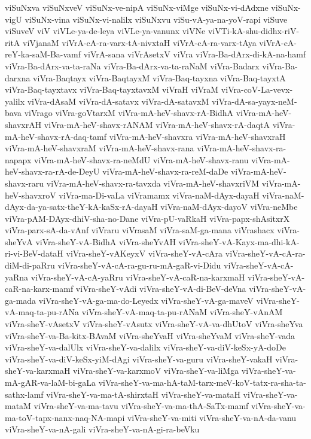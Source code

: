 {viSuNxva
viSuNxveV
viSuNx-ve-nipA
viSuNx-viMge
viSuNx-vi-dAdxne
viSuNx-vigU
viSuNx-vina
viSuNx-vi-nalilx
viSuNxvu
viSu-vA-ya-na-yoV-rapi
viSuve
viSuveV
viV
viVLe-ya-de-leya
viVLe-ya-vanunx
viVNe
viVTi-kA-shu-didhx-riV-ritA
viVjanaM
viVrA-cA-ra-varx-tA-nivxtaH
viVrA-cA-ra-varx-tAya
viVrA-cA-reY-ka-saM-Ba-vamf
viVrA-sana
viVrAsetxV
viVra
viVra-Ba-dArx-di-kA-na-hamf
viVra-Ba-dArx-va-ta-raNa
viVra-Ba-dArx-va-ta-raNaM
viVra-Badarx
viVra-Ba-darxna
viVra-Baqtayx
viVra-BaqtayxM
viVra-Baq-tayxna
viVra-Baq-tayxtA
viVra-Baq-tayxtavx
viVra-Baq-tayxtavxM
viVraH
viVraM
viVra-coV-La-vevx-yalilx
viVra-dAsaM
viVra-dA-satavx
viVra-dA-satavxM
viVra-dA-sa-yayx-neM-bava
viVrago
viVra-goVtarxM
viVra-mA-heV-shavx-rA-BidhA
viVra-mA-heV-shavxrAH
viVra-mA-heV-shavx-rANAM
viVra-mA-heV-shavx-rA-daqtA
viVra-mA-heV-shavx-rA-daq-tamf
viVra-mA-heV-shavxra
viVra-mA-heV-shavxraH
viVra-mA-heV-shavxraM
viVra-mA-heV-shavx-rana
viVra-mA-heV-shavx-ra-napapx
viVra-mA-heV-shavx-ra-neMdU
viVra-mA-heV-shavx-ranu
viVra-mA-heV-shavx-ra-rA-de-DeyU
viVra-mA-heV-shavx-ra-reM-daDe
viVra-mA-heV-shavx-raru
viVra-mA-heV-shavx-ra-tavxda
viVra-mA-heV-shavxriVM
viVra-mA-heV-shavxroV
viVra-ma-Di-vaLa
viVramamx
viVra-naM-dAyx-dayaH
viVra-naM-dAyx-da-ya-satx-theY-kA-kaSx-rA-dayaH
viVra-naM-dAyx-dayoV
viVra-neMbe
viVra-pAM-DAyx-dhiV-sha-no-Dane
viVra-pU-vaRkaH
viVra-papx-shAsitxrX
viVra-parx-sA-da-vAnf
viVraru
viVrasaM
viVra-saM-ga-mana
viVrashacx
viVra-sheYvA
viVra-sheY-vA-BidhA
viVra-sheYvAH
viVra-sheY-vA-Kayx-ma-dhi-kA-ri-vi-BeV-dataH
viVra-sheY-vAKeyxV
viVra-sheY-vA-cAra
viVra-sheY-vA-cA-ra-diM-di-paRru
viVra-sheY-vA-cA-ra-gu-ru-mA-gaR-vi-Didu
viVra-sheY-vA-cA-yaRna
viVra-sheY-vA-cA-yaRru
viVra-sheY-vA-caR-na-karxmaH
viVra-sheY-vA-caR-na-karx-mamf
viVra-sheY-vAdi
viVra-sheY-vA-di-BeV-deVna
viVra-sheY-vA-ga-mada
viVra-sheY-vA-ga-ma-do-Leyedx
viVra-sheY-vA-ga-maveV
viVra-sheY-vA-maq-ta-pu-rANa
viVra-sheY-vA-maq-ta-pu-rANaM
viVra-sheY-vAnAM
viVra-sheY-vAsetxV
viVra-sheY-vAsutx
viVra-sheY-vA-va-dhUtoV
viVra-sheYva
viVra-sheY-va-Ba-kitx-BAvaM
viVra-sheYvaH
viVra-sheYvaM
viVra-sheY-vada
viVra-sheY-va-dalUlx
viVra-sheY-va-dalilx
viVra-sheY-va-diV-keSx-yA-doDe
viVra-sheY-va-diV-keSx-yiM-dAgi
viVra-sheY-va-guru
viVra-sheY-vakaH
viVra-sheY-va-karxmaH
viVra-sheY-va-karxmoV
viVra-sheY-va-liMga
viVra-sheY-va-mA-gAR-va-laM-bi-gaLa
viVra-sheY-va-ma-hA-taM-tarx-meV-koV-tatx-ra-sha-ta-sathx-lamf
viVra-sheY-va-ma-tA-shirxtaH
viVra-sheY-va-mataH
viVra-sheY-va-mataM
viVra-sheY-va-ma-tavu
viVra-sheY-va-ma-thA-SaTx-mamf
viVra-sheY-va-ma-toV-tapx-nanx-naq-NA-mapi
viVra-sheY-va-miti
viVra-sheY-va-nA-da-vanu
viVra-sheY-va-nA-gali
viVra-sheY-va-nA-gi-ra-beVku
}
